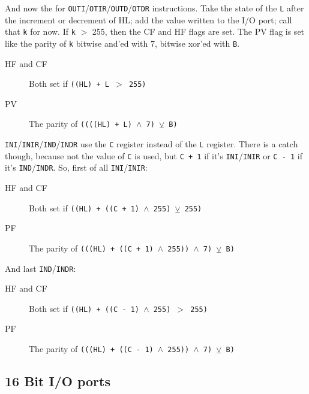 \pagebreak %
And now the for {\tt OUTI}/{\tt OTIR}/{\tt OUTD}/{\tt OTDR} instructions. Take the state of the {\tt L} after the increment or decrement of HL; add the value written to the I/O port; call that {\tt k} for now. If {\tt k} $>$ 255, then the CF and HF flags are set. The PV flag is set like the parity of {\tt k} bitwise and'ed with 7, bitwise xor'ed with {\tt B}.

\begin{description}

	\item[HF and CF]
	Both set if {\tt ((HL) + L  $>$ 255)}

	\item[PV]
	The parity of {\tt ((((HL) + L) $\wedge$ 7) $\veebar$ B)}

\end{description}

{\tt INI}/{\tt INIR}/{\tt IND}/{\tt INDR} use the {\tt C} register instead of the {\tt L} register. There is a catch though, because not the value of {\tt C} is used, but {\tt C + 1} if it's {\tt INI}/{\tt INIR} or {\tt C - 1} if it's {\tt IND}/{\tt INDR}. So, first of all {\tt INI}/{\tt INIR}:

\begin{description}

	\item[HF and CF]
	Both set if {\tt ((HL) + ((C + 1) $\wedge$ 255)  $\veebar$ 255)}

	\item[PF]
	The parity of {\tt (((HL) + ((C + 1) $\wedge$ 255)) $\wedge$ 7) $\veebar$ B)}

\end{description}

And last {\tt IND}/{\tt INDR}:

\begin{description}

	\item[HF and CF]
	Both set if {\tt ((HL) + ((C - 1) $\wedge$ 255) $>$ 255)}

	\item[PF]
	The parity of {\tt (((HL) + ((C - 1) $\wedge$ 255)) $\wedge$ 7) $\veebar$ B)}

\end{description}


\subsection{16 Bit I/O ports}

